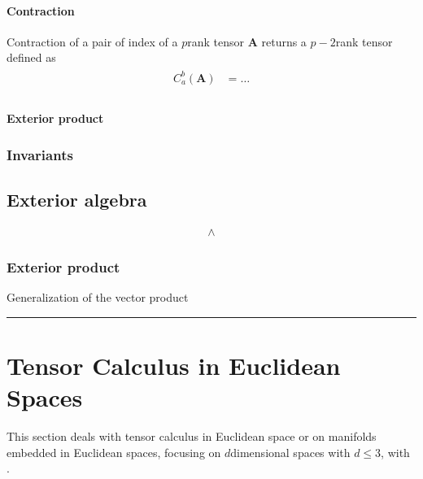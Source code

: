 \documentclass[letterpaper,10pt,english]{jupyterBook}
\begin{document}
\subsubsection{Contraction}
\label{\detokenize{ch/tensor-algebra-calculus/algebra:contraction}}
\sphinxAtStartPar
Contraction of a pair of index of a \(p\)\sphinxhyphen{}rank tensor \(\mathbf{A}\) returns a \(p-2\)\sphinxhyphen{}rank tensor defined as
\begin{equation*}
\begin{split}\begin{aligned}
  C_{a}^b \left( \mathbf{A} \right) 
  & = \dots \\
\end{aligned}\end{split}
\end{equation*}

\subsubsection{Exterior product}
\label{\detokenize{ch/tensor-algebra-calculus/algebra:exterior-product}}
\sphinxAtStartPar
{} 


\subsection{Invariants}
\label{\detokenize{ch/tensor-algebra-calculus/algebra:invariants}}

\section{Exterior algebra}
\label{\detokenize{ch/tensor-algebra-calculus/algebra:exterior-algebra}}\begin{equation*}
\begin{split}\land\end{split}
\end{equation*}

\subsection{Exterior product}
\label{\detokenize{ch/tensor-algebra-calculus/algebra:id6}}
\sphinxAtStartPar
Generalization of the vector product


\bigskip\hrule\bigskip


\sphinxstepscope


\chapter{Tensor Calculus in Euclidean Spaces}
\label{\detokenize{ch/tensor-algebra-calculus/calculus-euclidean:tensor-calculus-in-euclidean-spaces}}\label{\detokenize{ch/tensor-algebra-calculus/calculus-euclidean:tensor-calculus}}\label{\detokenize{ch/tensor-algebra-calculus/calculus-euclidean::doc}}
\sphinxAtStartPar
This section deals with tensor calculus in Euclidean space or on manifolds embedded in Euclidean spaces, focusing on \(d\)\sphinxhyphen{}dimensional spaces with \(d \le 3\), with .
\end{document}
